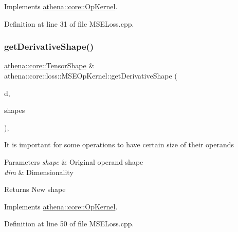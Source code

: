 Implements \mbox{\hyperlink{classathena_1_1core_1_1_op_kernel_ad500db1afc5a7c10acff8ecb8f1bee4d}{athena\+::core\+::\+Op\+Kernel}}.



Definition at line 31 of file M\+S\+E\+Loss.\+cpp.

\mbox{\label{classathena_1_1core_1_1loss_1_1_m_s_e_op_kernel_a68a0220e3a3591638c7725b5cb659609}} 
\subsubsection{\texorpdfstring{get\+Derivative\+Shape()}{getDerivativeShape()}}
{\footnotesize\ttfamily \mbox{\hyperlink{classathena_1_1core_1_1_tensor_shape}{athena\+::core\+::\+Tensor\+Shape}} \& athena\+::core\+::loss\+::\+M\+S\+E\+Op\+Kernel\+::get\+Derivative\+Shape (\begin{DoxyParamCaption}\item[{int}]{d,  }\item[{std\+::vector$<$ \mbox{\hyperlink{classathena_1_1core_1_1_tensor_shape}{athena\+::core\+::\+Tensor\+Shape}} $>$ \&}]{shapes }\end{DoxyParamCaption})\hspace{0.3cm}{\ttfamily [override]}, {\ttfamily [virtual]}}

It is important for some operations to have certain size of their operands 
\begin{DoxyParams}{Parameters}
{\em shape} & Original operand shape \\
\hline
{\em dim} & Dimensionality \\
\hline
\end{DoxyParams}
\begin{DoxyReturn}{Returns}
New shape 
\end{DoxyReturn}


Implements \mbox{\hyperlink{classathena_1_1core_1_1_op_kernel_ad95af6dd184ce7ee9182ec7ca54b6c4d}{athena\+::core\+::\+Op\+Kernel}}.



Definition at line 50 of file M\+S\+E\+Loss.\+cpp.

\mbox{\label{classathena_1_1core_1_1loss_1_1_m_s_e_op_kernel_ab851ee62ea95c3aab8aab2d28cfa9d04}} 
